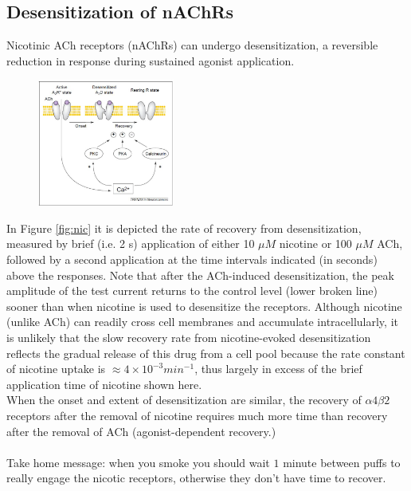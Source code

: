 \documentclass{book}
\begin{document}
\subsection{Desensitization of nAChRs}
Nicotinic ACh receptors (nAChRs) can undergo desensitization, a reversible reduction in response during sustained agonist application.

\begin{figure}
    \centering
    \includegraphics[width=0.4\textwidth]{images3/image5.png}
\end{figure}


In Figure \ref{fig:nic} it is depicted the rate of recovery from desensitization, measured by brief (i.e. 2 s) application of either 10 $\mu M$ nicotine or 100 $\mu M$ ACh, followed by a second application at the time intervals indicated (in seconds) above the responses. 
Note that after the ACh-induced desensitization, the peak amplitude of the test current returns to the control level (lower broken line) sooner than when nicotine is used to desensitize the receptors. 
Although nicotine (unlike ACh) can readily cross cell membranes and accumulate intracellularly, it is unlikely that the slow recovery rate from nicotine-evoked desensitization reflects the gradual release of this drug from a cell pool because the rate constant of nicotine uptake is $\approx 4 \times 10^{-3} min^{-1}$, thus largely in excess of the brief application time of nicotine shown here.
\\
When the onset and extent of desensitization are similar, the recovery of $\alpha 4 \beta 2$ receptors after the removal of nicotine requires much more time than recovery after the removal of ACh (agonist-dependent recovery.)
\\
\\
Take home message: when you smoke you should wait $1$ minute between puffs to really engage the nicotic receptors, otherwise they don't have time to recover.
\end{document}
